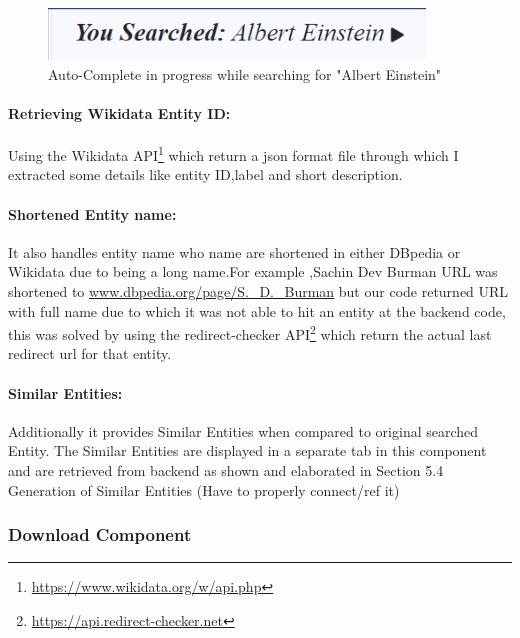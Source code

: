 \documentclass[head,11pt]{llncs}
\begin{document}
\begin{figure}[h!]
\centering
\includegraphics[width=100mm]{figures/sound.png}
\caption{Auto-Complete in progress while searching for "Albert Einstein"}
\label{fig:sound}
\end{figure}

\paragraph{\textbf{Retrieving Wikidata Entity ID:}}
 Using the Wikidata API\footnote{\url{https://www.wikidata.org/w/api.php}} which return a json format file through which I extracted some details like entity ID,label and short description. 


\paragraph{\textbf{Shortened Entity name:}}
It also handles entity name who name are shortened in either DBpedia or Wikidata due to being a long name.For example ,Sachin Dev Burman URL was shortened to \url{www.dbpedia.org/page/S._D._Burman} but our code returned URL with full name  due to which it was not able to hit an entity at the backend code, this was solved by using the redirect-checker API\footnote{\url{https://api.redirect-checker.net}}  which return the actual last redirect url for that entity.

\paragraph{\textbf{Similar Entities:}}
Additionally it provides Similar Entities when compared to original searched Entity.
The Similar Entities are displayed in a separate tab in this component and are retrieved from backend as shown and elaborated in Section 5.4 Generation of Similar Entities (Have to properly connect/ref it) 


\subsubsection{Download Component}
\end{document}
